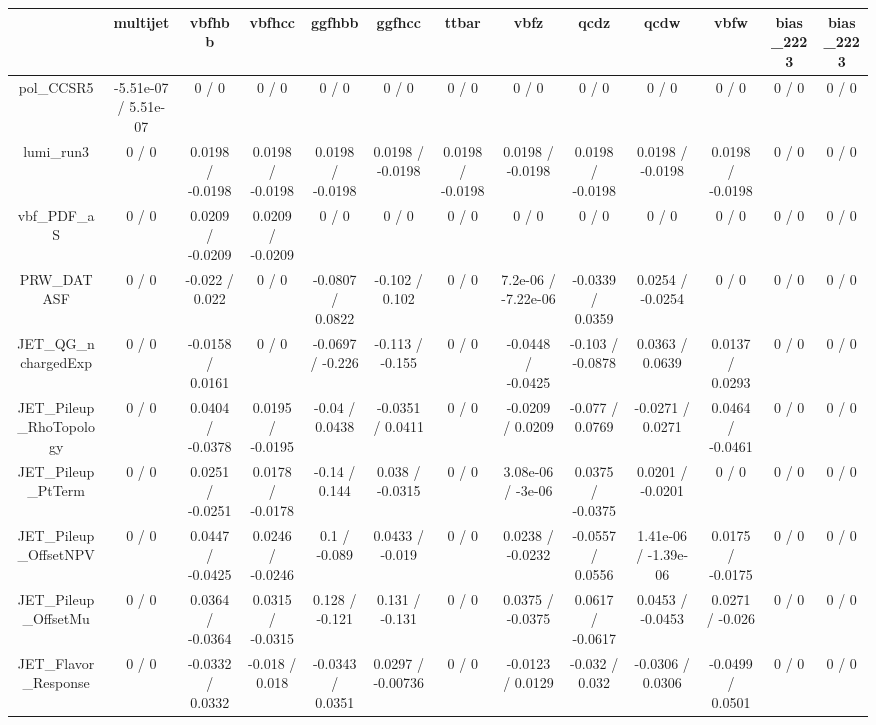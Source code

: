 \documentclass[10pt]{article}
\begin{document}
\begin{table}[htbp]
\begin{center}
\begin{tabular}{|c|c|c|c|c|c|c|c|c|c|c|c|c|}
\hline 
      & multijet      & vbfhbb      & vbfhcc      & ggfhbb      & ggfhcc      & ttbar      & vbfz      & qcdz      & qcdw      & vbfw      & bias_2223      & bias_2223 \\ 
\hline 
  pol_CCSR5 & -5.51e-07 / 5.51e-07 & 0 / 0 & 0 / 0 & 0 / 0 & 0 / 0 & 0 / 0 & 0 / 0 & 0 / 0 & 0 / 0 & 0 / 0 & 0 / 0 & 0 / 0 \\ 
  lumi_run3 & 0 / 0 & 0.0198 / -0.0198 & 0.0198 / -0.0198 & 0.0198 / -0.0198 & 0.0198 / -0.0198 & 0.0198 / -0.0198 & 0.0198 / -0.0198 & 0.0198 / -0.0198 & 0.0198 / -0.0198 & 0.0198 / -0.0198 & 0 / 0 & 0 / 0 \\ 
  vbf_PDF_aS & 0 / 0 & 0.0209 / -0.0209 & 0.0209 / -0.0209 & 0 / 0 & 0 / 0 & 0 / 0 & 0 / 0 & 0 / 0 & 0 / 0 & 0 / 0 & 0 / 0 & 0 / 0 \\ 
  PRW_DATASF & 0 / 0 & -0.022 / 0.022 & 0 / 0 & -0.0807 / 0.0822 & -0.102 / 0.102 & 0 / 0 & 7.2e-06 / -7.22e-06 & -0.0339 / 0.0359 & 0.0254 / -0.0254 & 0 / 0 & 0 / 0 & 0 / 0 \\ 
  JET_QG_nchargedExp & 0 / 0 & -0.0158 / 0.0161 & 0 / 0 & -0.0697 / -0.226 & -0.113 / -0.155 & 0 / 0 & -0.0448 / -0.0425 & -0.103 / -0.0878 & 0.0363 / 0.0639 & 0.0137 / 0.0293 & 0 / 0 & 0 / 0 \\ 
  JET_Pileup_RhoTopology & 0 / 0 & 0.0404 / -0.0378 & 0.0195 / -0.0195 & -0.04 / 0.0438 & -0.0351 / 0.0411 & 0 / 0 & -0.0209 / 0.0209 & -0.077 / 0.0769 & -0.0271 / 0.0271 & 0.0464 / -0.0461 & 0 / 0 & 0 / 0 \\ 
  JET_Pileup_PtTerm & 0 / 0 & 0.0251 / -0.0251 & 0.0178 / -0.0178 & -0.14 / 0.144 & 0.038 / -0.0315 & 0 / 0 & 3.08e-06 / -3e-06 & 0.0375 / -0.0375 & 0.0201 / -0.0201 & 0 / 0 & 0 / 0 & 0 / 0 \\ 
  JET_Pileup_OffsetNPV & 0 / 0 & 0.0447 / -0.0425 & 0.0246 / -0.0246 & 0.1 / -0.089 & 0.0433 / -0.019 & 0 / 0 & 0.0238 / -0.0232 & -0.0557 / 0.0556 & 1.41e-06 / -1.39e-06 & 0.0175 / -0.0175 & 0 / 0 & 0 / 0 \\ 
  JET_Pileup_OffsetMu & 0 / 0 & 0.0364 / -0.0364 & 0.0315 / -0.0315 & 0.128 / -0.121 & 0.131 / -0.131 & 0 / 0 & 0.0375 / -0.0375 & 0.0617 / -0.0617 & 0.0453 / -0.0453 & 0.0271 / -0.026 & 0 / 0 & 0 / 0 \\ 
  JET_Flavor_Response & 0 / 0 & -0.0332 / 0.0332 & -0.018 / 0.018 & -0.0343 / 0.0351 & 0.0297 / -0.00736 & 0 / 0 & -0.0123 / 0.0129 & -0.032 / 0.032 & -0.0306 / 0.0306 & -0.0499 / 0.0501 & 0 / 0 & 0 / 0 \\ 

\end{tabular}
\end{center}
\end{table}
\end{document}
